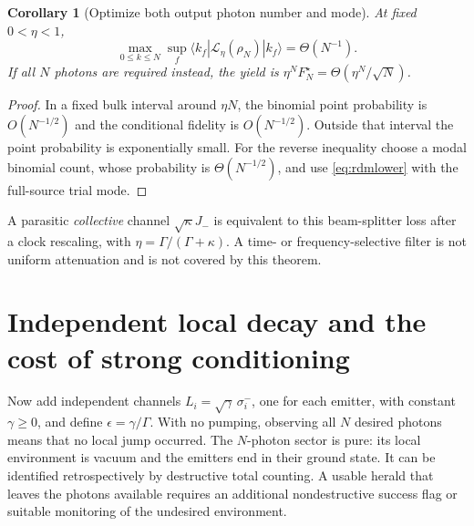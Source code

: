 \documentclass[11pt,a4paper]{article}
\newtheorem{corollary}[theorem]{Corollary}
\begin{document}
\begin{corollary}[Optimize both output photon number and mode]
At fixed \(0<\eta<1\),
\begin{equation}
 \max_{0\le k\le N}\sup_f
 \langle k_f|\mathcal L_\eta(\rho_N)|k_f\rangle
 =\Theta(N^{-1}).
 \label{eq:anynumber}
\end{equation}
If all \(N\) photons are required instead, the yield is
\(\eta^NF_N^\star=\Theta(\eta^N/\sqrt N)\).
\end{corollary}
\begin{proof}
In a fixed bulk interval around \(\eta N\), the binomial point
probability is \(O(N^{-1/2})\) and the conditional fidelity is
\(O(N^{-1/2})\). Outside that interval the point probability is
exponentially small. For the reverse inequality choose a modal
binomial count, whose probability is \(\Theta(N^{-1/2})\), and use
\eqref{eq:rdmlower} with the full-source trial mode.
\end{proof}

A parasitic \emph{collective} channel \(\sqrt{\kappa}J_-\) is equivalent
to this beam-splitter loss after a clock rescaling, with
\(\eta=\Gamma/(\Gamma+\kappa)\). A time- or frequency-selective
filter is not uniform attenuation and is not covered by this theorem.

\section{Independent local decay and the cost of strong conditioning}
\label{sec:local}

Now add independent channels
\(L_i=\sqrt{\gamma}\,\sigma_i^-\), one for each emitter, with constant
\(\gamma\ge0\), and define \(\epsilon=\gamma/\Gamma\).
With no pumping, observing all \(N\) desired photons means that no
local jump occurred. The \(N\)-photon sector is pure: its local
environment is vacuum and the emitters end in their ground state.
It can be identified retrospectively by destructive total counting.
A usable herald that leaves the photons available requires an
additional nondestructive success flag or suitable monitoring of the
undesired environment.
\end{document}

